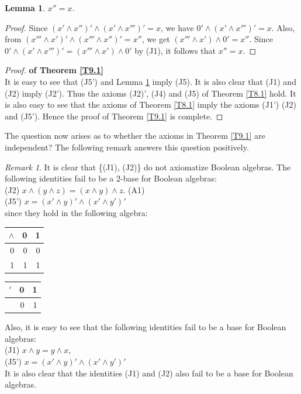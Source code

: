 \documentclass{amsart}
\theoremstyle{plain}
\newtheorem{lemma}[theorem]{Lemma}
\theoremstyle{problem}
\theoremstyle{definition}
\theoremstyle{remark}
\newtheorem{remark}[theorem]{Remark}
\numberwithin{equation}{section}
\begin{document}
\begin{lemma} \label{94}
    $x''=x$.
\end{lemma}
\begin{proof}
    Since $(x' \land x'')' \land (x' \land x''')' = x$, we have $0' \land (x' \land x''')' = x$.  Also,
    from $(x''' \land x')' \land (x''' \land x'')' = x''$, we get $(x''' \land x') \land 0' = x''$.  Since $0' \land (x' \land x''')' = (x''' \land x') \land 0' $ by  (J1), it follows that $x''=x$.
\end{proof}

\begin{proof}{\bf of Theorem \ref{T9.1}}\\
    It is easy to see that (J5') and Lemma \ref{94} imply (J5).  It is also clear that (J1) and (J2) imply (J2'). Thus the axioms 
 (J2)', (J4) and (J5) of Theorem \ref{T8.1} hold.  It is also easy to see that the axioms of Theorem \ref{T8.1} imply the axioms (J1') (J2) and (J5').  Hence the proof of Theorem \ref{T9.1} is complete. 
\end{proof}
 
The question now arises as to whether  the axioms in Theorem \ref{T9.1} are independent?  The following remark answers this question positively.

\begin{remark} It is clear that \{(J1), (J2)\} do not axiomatize Boolean algebras.  
The following identities fail to be  a 2-base for Boolean algebras:\\
(J2) $x \land (y \land z)=(x \land y) \land z$. (A1)  \\
(J5') $x=(x' \land y)' \land (x' \land y')'$\\ 
since they hold in the following algebra: \\

 

\begin{tabular}{r|rr}
$\land$ & 0 & 1\\
\hline
    0 & 0 & 0 \\
    1 & 1 & 1
\end{tabular} \hspace{.5cm}
\begin{tabular}{r|rr}
$'$ & 0 & 1\\
\hline
   & 0 & 1
\end{tabular} 

\medskip
Also, it is easy to see that the following identities fail to be  a base for Boolean algebras:\\
(J1) $x \land y = y \land x$,   \\
(J5') $x=(x' \land y)' \land (x' \land y')'$\\ 
It is also clear that the identities (J1) and (J2) also fail to be  a base for Boolean algebras.
\end{remark}
\end{document}
